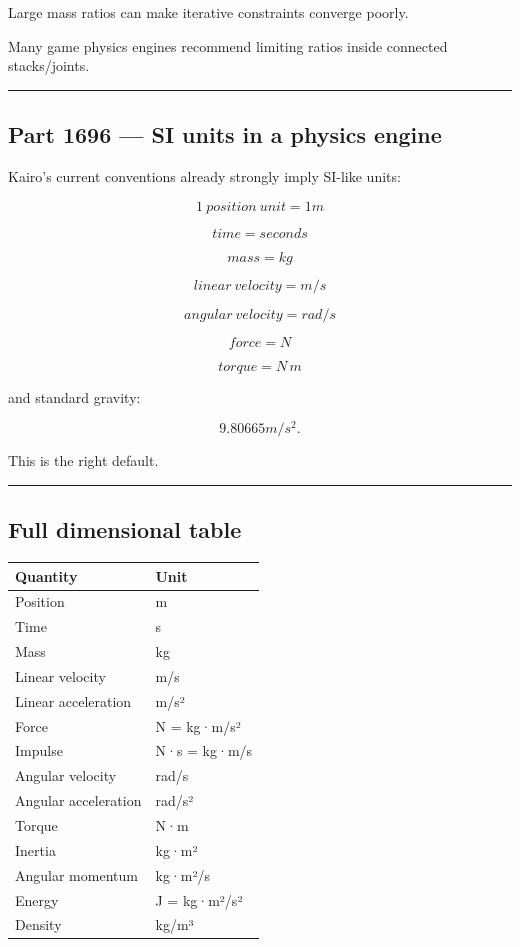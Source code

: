 Large mass ratios can make iterative constraints converge poorly.

Many game physics engines recommend limiting ratios inside connected stacks/joints.

\begin{center}\rule{0.5\linewidth}{0.5pt}\end{center}

\subsection{Part 1696 --- SI units in a physics engine}\label{06-engine-ii-ch039-part-1696-si-units-in-a-physics-engine}

Kairo's current conventions already strongly imply SI-like units:

\[
\boxed{
1\ position\ unit=1m
}
\]

\[
\boxed{
time=seconds
}
\]

\[
\boxed{
mass=kg
}
\]

\[
\boxed{
linear\ velocity=m/s
}
\]

\[
\boxed{
angular\ velocity=rad/s
}
\]

\[
\boxed{
force=N
}
\]

\[
\boxed{
torque=N\,m
}
\]

and standard gravity:

\[
9.80665m/s^2.
\]

This is the right default.

\begin{center}\rule{0.5\linewidth}{0.5pt}\end{center}

\subsection{Full dimensional table}\label{06-engine-ii-ch039-full-dimensional-table}

{\def\LTcaptype{none} %
\begin{longtable}[]{@{}ll@{}}
\toprule\noalign{}
Quantity & Unit \\
\midrule\noalign{}
\endhead
\bottomrule\noalign{}
\endlastfoot
Position & m \\
Time & s \\
Mass & kg \\
Linear velocity & m/s \\
Linear acceleration & m/s² \\
Force & N = kg·m/s² \\
Impulse & N·s = kg·m/s \\
Angular velocity & rad/s \\
Angular acceleration & rad/s² \\
Torque & N·m \\
Inertia & kg·m² \\
Angular momentum & kg·m²/s \\
Energy & J = kg·m²/s² \\
Density & kg/m³ \\
\end{longtable}
}

